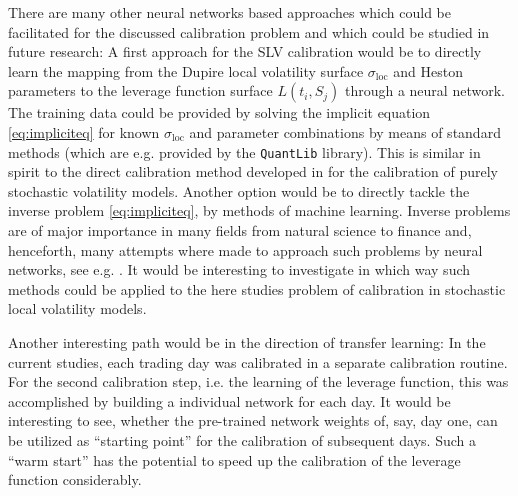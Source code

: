 \documentclass[
a4paper,     %
12pt           %
]{scrartcl}  %
\numberwithin{equation}{section}
\begin{document}
There are many other neural networks based approaches which could be facilitated for the discussed calibration problem and which could be studied in future research: A first approach for the SLV calibration would be to directly learn the mapping from the Dupire local volatility surface $\sigma_\text{loc}$ and Heston parameters to the leverage function surface $L(t_i,S_j)$ through a neural network. The training data could be provided by solving the implicit equation \eqref{eq:impliciteq} for known $\sigma_\text{loc}$ and parameter combinations by means of standard methods (which are e.g. provided by the \texttt{QuantLib} library). This is similar in spirit to the direct calibration method developed in \cite{hernandez_model_2016} for the calibration of purely stochastic volatility models. Another option would be to directly tackle the inverse problem \eqref{eq:impliciteq}, by methods of machine learning. Inverse problems are of major importance in many fields from natural science to finance and, henceforth, many attempts where made to approach such problems by neural networks, see e.g. \cite{li_nett_2020,arridge_solving_2019,genzel_solving_2020}. It would be interesting to investigate in which way such methods could be applied to the here studies problem of calibration in stochastic local volatility models.

Another interesting path would be in the direction of transfer learning: In the current studies, each trading day was calibrated in a separate calibration routine. For the second calibration step, i.e. the learning of the leverage function, this was accomplished by building a individual network for each day. It would be interesting to see, whether the pre-trained network weights of, say, day one, can be utilized as ``starting point'' for the calibration of subsequent days. Such a ``warm start'' has the potential to speed up the calibration of the leverage function considerably.



\newpage


\end{document}
